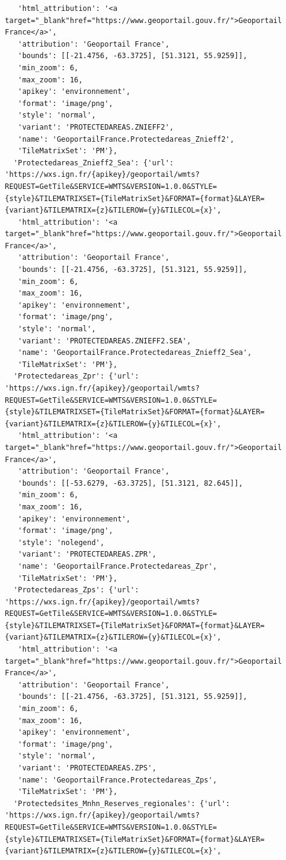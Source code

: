 \documentclass[
  letterpaper,
  DIV=11,
  numbers=noendperiod]{scrreprt}
\begin{document}
\begin{verbatim}
   'html_attribution': '<a target="_blank"href="https://www.geoportail.gouv.fr/">Geoportail France</a>',
   'attribution': 'Geoportail France',
   'bounds': [[-21.4756, -63.3725], [51.3121, 55.9259]],
   'min_zoom': 6,
   'max_zoom': 16,
   'apikey': 'environnement',
   'format': 'image/png',
   'style': 'normal',
   'variant': 'PROTECTEDAREAS.ZNIEFF2',
   'name': 'GeoportailFrance.Protectedareas_Znieff2',
   'TileMatrixSet': 'PM'},
  'Protectedareas_Znieff2_Sea': {'url': 'https://wxs.ign.fr/{apikey}/geoportail/wmts?REQUEST=GetTile&SERVICE=WMTS&VERSION=1.0.0&STYLE={style}&TILEMATRIXSET={TileMatrixSet}&FORMAT={format}&LAYER={variant}&TILEMATRIX={z}&TILEROW={y}&TILECOL={x}',
   'html_attribution': '<a target="_blank"href="https://www.geoportail.gouv.fr/">Geoportail France</a>',
   'attribution': 'Geoportail France',
   'bounds': [[-21.4756, -63.3725], [51.3121, 55.9259]],
   'min_zoom': 6,
   'max_zoom': 16,
   'apikey': 'environnement',
   'format': 'image/png',
   'style': 'normal',
   'variant': 'PROTECTEDAREAS.ZNIEFF2.SEA',
   'name': 'GeoportailFrance.Protectedareas_Znieff2_Sea',
   'TileMatrixSet': 'PM'},
  'Protectedareas_Zpr': {'url': 'https://wxs.ign.fr/{apikey}/geoportail/wmts?REQUEST=GetTile&SERVICE=WMTS&VERSION=1.0.0&STYLE={style}&TILEMATRIXSET={TileMatrixSet}&FORMAT={format}&LAYER={variant}&TILEMATRIX={z}&TILEROW={y}&TILECOL={x}',
   'html_attribution': '<a target="_blank"href="https://www.geoportail.gouv.fr/">Geoportail France</a>',
   'attribution': 'Geoportail France',
   'bounds': [[-53.6279, -63.3725], [51.3121, 82.645]],
   'min_zoom': 6,
   'max_zoom': 16,
   'apikey': 'environnement',
   'format': 'image/png',
   'style': 'nolegend',
   'variant': 'PROTECTEDAREAS.ZPR',
   'name': 'GeoportailFrance.Protectedareas_Zpr',
   'TileMatrixSet': 'PM'},
  'Protectedareas_Zps': {'url': 'https://wxs.ign.fr/{apikey}/geoportail/wmts?REQUEST=GetTile&SERVICE=WMTS&VERSION=1.0.0&STYLE={style}&TILEMATRIXSET={TileMatrixSet}&FORMAT={format}&LAYER={variant}&TILEMATRIX={z}&TILEROW={y}&TILECOL={x}',
   'html_attribution': '<a target="_blank"href="https://www.geoportail.gouv.fr/">Geoportail France</a>',
   'attribution': 'Geoportail France',
   'bounds': [[-21.4756, -63.3725], [51.3121, 55.9259]],
   'min_zoom': 6,
   'max_zoom': 16,
   'apikey': 'environnement',
   'format': 'image/png',
   'style': 'normal',
   'variant': 'PROTECTEDAREAS.ZPS',
   'name': 'GeoportailFrance.Protectedareas_Zps',
   'TileMatrixSet': 'PM'},
  'Protectedsites_Mnhn_Reserves_regionales': {'url': 'https://wxs.ign.fr/{apikey}/geoportail/wmts?REQUEST=GetTile&SERVICE=WMTS&VERSION=1.0.0&STYLE={style}&TILEMATRIXSET={TileMatrixSet}&FORMAT={format}&LAYER={variant}&TILEMATRIX={z}&TILEROW={y}&TILECOL={x}',

\end{verbatim}
\end{document}
